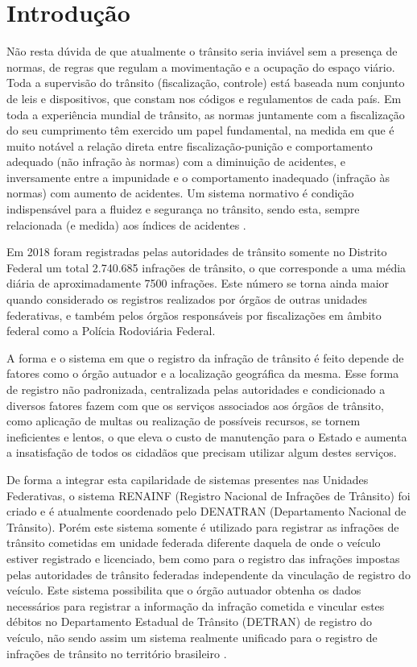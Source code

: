 \chapter[Introdução]{Introdução}




Não resta dúvida de que atualmente o trânsito seria inviável sem a presença de normas, de regras que regulam a movimentação e a ocupação do espaço viário. Toda a supervisão do trânsito (fiscalização, controle) está baseada num conjunto de leis e dispositivos, que constam nos códigos e regulamentos de cada país. Em toda a experiência mundial de trânsito, as normas juntamente com a fiscalização do seu cumprimento têm exercido um papel fundamental, na medida em que é muito notável a relação direta entre fiscalização-punição e comportamento adequado (não infração às normas) com a diminuição de acidentes, e inversamente entre a impunidade e o comportamento inadequado (infração às normas) com aumento de acidentes. Um sistema normativo é condição indispensável para a fluidez e segurança no trânsito, sendo esta, sempre relacionada (e medida) aos índices de acidentes \cite{article_transito_alcool}.

Em 2018 foram registradas pelas autoridades de trânsito somente no Distrito Federal um total 2.740.685 infrações de trânsito, o que corresponde a uma média diária de aproximadamente 7500 infrações. Este número se torna ainda maior quando considerado os registros realizados por órgãos de outras unidades federativas, e também pelos órgãos responsáveis por fiscalizações em âmbito federal como a Polícia Rodoviária Federal.

A forma e o sistema em que o registro da infração de trânsito é feito depende de fatores como o órgão autuador e a localização geográfica da mesma. Esse forma de registro não padronizada, centralizada pelas autoridades e condicionado a diversos fatores fazem com que os serviços associados aos órgãos de trânsito, como aplicação de multas ou realização de possíveis recursos, se tornem ineficientes e lentos, o que eleva o custo de manutenção para o Estado e aumenta a insatisfação de todos os cidadãos que precisam utilizar algum destes serviços.

De forma a integrar esta capilaridade de sistemas presentes nas Unidades Federativas, o sistema RENAINF (Registro Nacional de Infrações de Trânsito) foi criado e é atualmente coordenado pelo DENATRAN (Departamento Nacional de Trânsito). Porém este sistema somente é utilizado para registrar as infrações de trânsito cometidas em unidade federada diferente daquela de onde o veículo estiver registrado e licenciado, bem como para o registro das infrações impostas pelas autoridades de trânsito federadas independente da vinculação de registro do veículo. Este sistema possibilita que o órgão autuador obtenha os dados necessários para registrar a informação da infração cometida e vincular estes débitos no Departamento Estadual de Trânsito  (DETRAN) de registro do veículo, não sendo assim um sistema realmente unificado para o registro de infrações de trânsito no território brasileiro \cite{renainf_fazenda_sp}.

